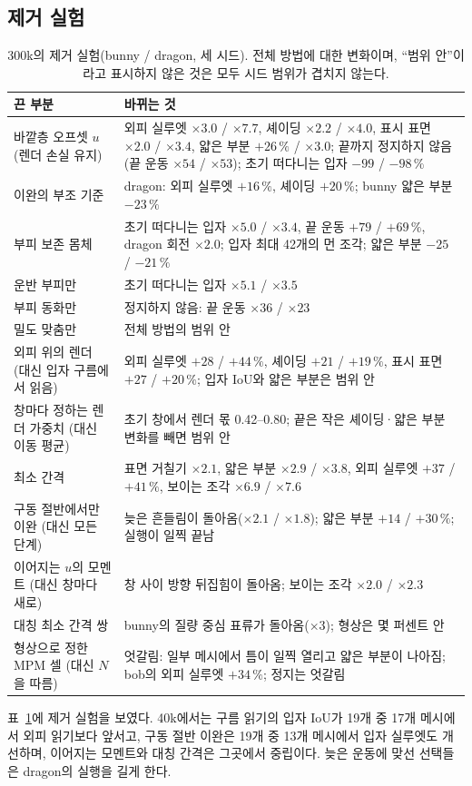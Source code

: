 \subsection{제거 실험}
\begin{table}[t]
\centering
\footnotesize
\setlength{\tabcolsep}{4pt}
\caption{300k의 제거 실험(bunny / dragon, 세 시드). \textmd{전체 방법에 대한 변화이며, ``범위 안''이라고 표시하지 않은 것은
모두 시드 범위가 겹치지 않는다.}}
\label{ch4:tab_ablation_ko}
\begin{tabular}{>{\raggedright\arraybackslash}p{3.6cm}>{\raggedright\arraybackslash}p{9.8cm}}
\toprule
끈 부분 & 바뀌는 것 \\
\midrule
바깥층 오프셋 $u$ (렌더 손실 유지) & 외피 실루엣 $\times3.0$ / $\times7.7$, 셰이딩 $\times2.2$ / $\times4.0$, 표시 표면
  $\times2.0$ / $\times3.4$, 얇은 부분 $+26\,\%$ / $\times3.0$; 끝까지 정지하지 않음(끝 운동 $\times54$ / $\times53$);
  초기 떠다니는 입자 $-99$ / $-98\,\%$ \\
이완의 부조 기준 & dragon: 외피 실루엣 $+16\,\%$, 셰이딩 $+20\,\%$; bunny 얇은 부분 $-23\,\%$ \\
부피 보존 몸체 & 초기 떠다니는 입자 $\times5.0$ / $\times3.4$, 끝 운동 $+79$ / $+69\,\%$, dragon 회전 $\times2.0$; 입자
  최대 42개의 먼 조각; 얇은 부분 $-25$ / $-21\,\%$ \\
\quad 운반 부피만 & 초기 떠다니는 입자 $\times5.1$ / $\times3.5$ \\
\quad 부피 동화만 & 정지하지 않음: 끝 운동 $\times36$ / $\times23$ \\
\quad 밀도 맞춤만 & 전체 방법의 범위 안 \\
외피 위의 렌더 (대신 입자 구름에서 읽음) & 외피 실루엣 $+28$ / $+44\,\%$, 셰이딩 $+21$ / $+19\,\%$, 표시 표면 $+27$ /
  $+20\,\%$; 입자 IoU와 얇은 부분은 범위 안 \\
창마다 정하는 렌더 가중치 (대신 이동 평균) & 초기 창에서 렌더 몫 0.42--0.80; 끝은 작은 셰이딩·얇은 부분 변화를 빼면 범위
  안 \\
최소 간격 & 표면 거칠기 $\times2.1$, 얇은 부분 $\times2.9$ / $\times3.8$, 외피 실루엣 $+37$ / $+41\,\%$, 보이는 조각
  $\times6.9$ / $\times7.6$ \\
구동 절반에서만 이완 (대신 모든 단계) & 늦은 흔들림이 돌아옴($\times2.1$ / $\times1.8$); 얇은 부분 $+14$ / $+30\,\%$; 실행이
  일찍 끝남 \\
이어지는 $u$의 모멘트 (대신 창마다 새로) & 창 사이 방향 뒤집힘이 돌아옴; 보이는 조각 $\times2.0$ / $\times2.3$ \\
대칭 최소 간격 쌍 & bunny의 질량 중심 표류가 돌아옴($\times3$); 형상은 몇 퍼센트 안 \\
형상으로 정한 MPM 셀 (대신 $N$을 따름) & 엇갈림: 일부 메시에서 틈이 일찍 열리고 얇은 부분이 나아짐; bob의 외피 실루엣
  $+34\,\%$; 정지는 엇갈림 \\
\bottomrule
\end{tabular}
\end{table}
표~\ref{ch4:tab_ablation_ko}에 제거 실험을 보였다. 40k에서는 구름 읽기의 입자 IoU가 19개 중 17개 메시에서 외피 읽기보다 앞서고,
구동 절반 이완은 19개 중 13개 메시에서 입자 실루엣도 개선하며, 이어지는 모멘트와 대칭 간격은 그곳에서 중립이다. 늦은 운동에
맞선 선택들은 dragon의 실행을 길게 한다.


